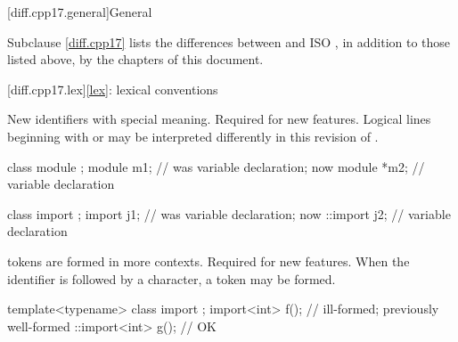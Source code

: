 [diff.cpp17.general]{General}

\pnum
{}%
Subclause \ref{diff.cpp17} lists the differences between \Cpp{} and
ISO \CppXVII{},
in addition to those listed above,
by the chapters of this document.

[diff.cpp17.lex]{\ref*{lex}: lexical conventions}

\change
New identifiers with special meaning.
\rationale
Required for new features.
\effect
Logical lines beginning with
 or  may
be interpreted differently
in this revision of \Cpp{}.
\begin{example}
\begin{codeblock}
class module {};
module m1;          // was variable declaration; now 
module *m2;         // variable declaration

class import {};
import j1;          // was variable declaration; now 
::import j2;        // variable declaration
\end{codeblock}
\end{example}

\change
{} tokens are formed in more contexts.
\rationale
Required for new features.
\effect
When the identifier 
is followed by a \tcode{<} character,
a  token may be formed.
\begin{example}
\begin{codeblock}
template<typename> class import {};
import<int> f();                // ill-formed; previously well-formed
::import<int> g();              // OK
\end{codeblock}
\end{example}

